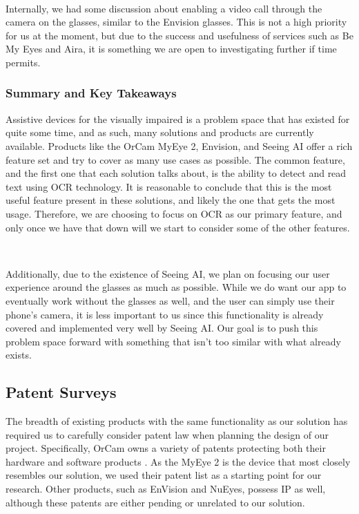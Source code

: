 \documentclass[a4paper,11pt]{article}
\begin{document}
\

\noindent
Internally, we had some discussion about enabling a video call through the camera on the glasses, similar to the Envision glasses. This is not a high priority for us at the moment, but due to the success and usefulness of services such as Be My Eyes and Aira, it is something we are open to investigating further if time permits.

\subsubsection{Summary and Key Takeaways}
Assistive devices for the visually impaired is a problem space that has existed for quite some time, and as such, many solutions and products are currently available. Products like the OrCam MyEye 2, Envision, and Seeing AI offer a rich feature set and try to cover as many use cases as possible. The common feature, and the first one that each solution talks about, is the ability to detect and read text using OCR technology. It is reasonable to conclude that this is the most useful feature present in these solutions, and likely the one that gets the most usage. Therefore, we are choosing to focus on OCR as our primary feature, and only once we have that down will we start to consider some of the other features.

\ 

\noindent
Additionally, due to the existence of Seeing AI, we plan on focusing our user experience around the glasses as much as possible. While we do want our app to eventually work without the glasses as well, and the user can simply use their phone's camera, it is less important to us since this functionality is already covered and implemented very well by Seeing AI. Our goal is to push this problem space forward with something that isn't too similar with what already exists.


\newpage
\subsection{Patent Surveys}
The breadth of existing products with the same functionality as our solution has required us to carefully consider patent law when planning the design of our project. Specifically, OrCam owns a variety of patents protecting both their hardware and software products \cite{orcam-patents}. As the MyEye 2 is the device that most closely resembles our solution, we used their patent list as a starting point for our research. Other products, such as EnVision and NuEyes, possess IP as well, although these patents are either pending \cite{envision-patent} or unrelated to our solution.
\end{document}
